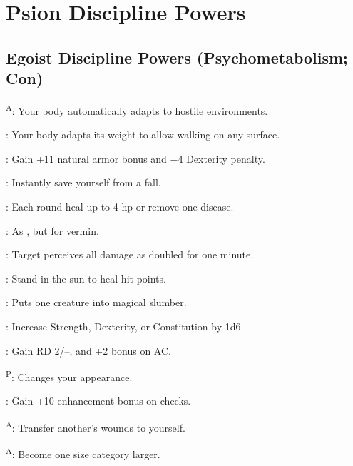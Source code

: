 \section{Psion Discipline Powers}



\subsection{Egoist Discipline Powers {\normalsize(Psychometabolism; Con)}}
\begin{enumerate*}
\item {}\textsuperscript{A}: Your body automatically adapts to hostile environments.

      : Your body adapts its weight to allow walking on any surface.

      : Gain +11 natural armor bonus and $-4$ Dexterity penalty.

      : Instantly save yourself from a fall. %

      : Each round heal up to 4 hp or remove one disease.

      : As , but for vermin.

      : Target perceives all damage as doubled for one minute.

      : Stand in the sun to heal hit points.

      : Puts one creature into magical slumber.

\item {}: Increase Strength, Dexterity, or Constitution by 1d6.

      : Gain RD 2/--, and +2 bonus on AC.

      \textsuperscript{P}: Changes your appearance.

      : Gain +10 enhancement bonus on  checks. %

      \textsuperscript{A}: Transfer another's wounds to yourself. %

      \textsuperscript{A}: Become one size category larger. %


\end{enumerate*}
